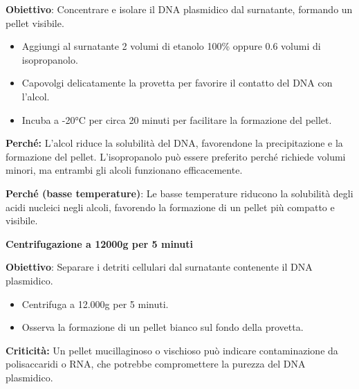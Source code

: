 \begin{enumerate}
\begin{noSplitBlock}
	      {\footnotesize \textbf{Obiettivo}: Concentrare e isolare il DNA plasmidico dal surnatante, formando un pellet visibile.}

	      \begin{itemize}
		      \item Aggiungi al surnatante 2 volumi di etanolo 100\% oppure 0.6 volumi di isopropanolo.
		      \item Capovolgi delicatamente la provetta per favorire il contatto del DNA con l’alcol.
		      \item Incuba a -20°C per circa 20 minuti per facilitare la formazione del pellet.
	      \end{itemize}

	      \begin{percheBox}
		      \textbf{Perché:} L’alcol riduce la solubilità del DNA, favorendone la precipitazione e la formazione del pellet. L’isopropanolo può essere preferito perché richiede volumi minori, ma entrambi gli alcoli funzionano efficacemente.
	      \end{percheBox}
	      \begin{percheBox}
		      \textbf{Perché (basse temperature)}: Le basse temperature riducono la solubilità degli acidi nucleici negli alcoli, favorendo la formazione di un pellet più compatto e visibile.
	      \end{percheBox}
\end{noSplitBlock}

\begin{noSplitBlock}
	\item \textbf{Centrifugazione a 12000g per 5 minuti}

	      {\footnotesize \textbf{Obiettivo}: Separare i detriti cellulari dal surnatante contenente il DNA plasmidico.}

	      \begin{itemize}
		      \item Centrifuga a 12.000g per 5 minuti.
		      \item Osserva la formazione di un pellet bianco sul fondo della provetta.
	      \end{itemize}

	      \begin{criticitaBox}
		      \textbf{Criticità:} Un pellet mucillaginoso o vischioso può indicare contaminazione da polisaccaridi o RNA, che potrebbe compromettere la purezza del DNA plasmidico.
	      \end{criticitaBox}
\end{noSplitBlock}


\end{enumerate}
